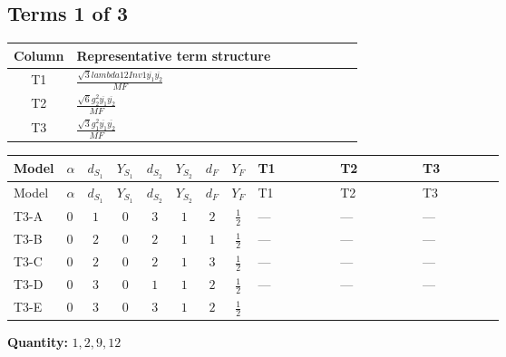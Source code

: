 \documentclass[8pt]{article}
\begin{document}
\begin{landscape}
\subsection*{Terms 1 of 3}
\begin{center}
\begin{tabular}{@{}c >{\raggedright\arraybackslash}p{0.82\linewidth}@{}}
\toprule
Column & Representative term structure \\
\midrule
T1 & \(\displaystyle \frac{\sqrt{3} lambda12Inv1 \overline{y_{1}} \overline{y_{2}}}{MF}\) \\
\midrule
T2 & \(\displaystyle \frac{\sqrt{6} g_{2}^{2} \overline{y_{1}} \overline{y_{2}}}{MF}\) \\
\midrule
T3 & \(\displaystyle \frac{\sqrt{3} g_{1}^{2} \overline{y_{1}} \overline{y_{2}}}{MF}\) \\
\midrule
\bottomrule
\end{tabular}
\end{center}
\smallskip
\tiny
\begin{longtable}{@{}llcccccc >{\raggedright\arraybackslash}p{0.21\linewidth} >{\raggedright\arraybackslash}p{0.21\linewidth} >{\raggedright\arraybackslash}p{0.21\linewidth}@{}}
\toprule
Model & $\alpha$ & $d_{S_1}$ & $Y_{S_1}$ & $d_{S_2}$ & $Y_{S_2}$ & $d_F$ & $Y_F$ & T1 & T2 & T3 \\
\midrule
\endfirsthead
\toprule
Model & $\alpha$ & $d_{S_1}$ & $Y_{S_1}$ & $d_{S_2}$ & $Y_{S_2}$ & $d_F$ & $Y_F$ & T1 & T2 & T3 \\
\midrule
\endhead
T3-A & $0$ & $1$ & $0$ & $3$ & $1$ & $2$ & $\frac{1}{2}$ & --- & --- & --- \\
\midrule
T3-B & $0$ & $2$ & $0$ & $2$ & $1$ & $1$ & $\frac{1}{2}$ & --- & --- & --- \\
\midrule
T3-C & $0$ & $2$ & $0$ & $2$ & $1$ & $3$ & $\frac{1}{2}$ & --- & --- & --- \\
\midrule
T3-D & $0$ & $3$ & $0$ & $1$ & $1$ & $2$ & $\frac{1}{2}$ & --- & --- & --- \\
\midrule
T3-E & $0$ & $3$ & $0$ & $3$ & $1$ & $2$ & $\frac{1}{2}$ & \scriptsize\adjustbox{max width=\linewidth}{$\begin{gathered} - \frac{\sqrt{3} lambda12Inv1 \overline{y_{1}} \overline{y_{2}}}{6 MF}\end{gathered}$} & \scriptsize\adjustbox{max width=\linewidth}{$\begin{gathered} \frac{\sqrt{6} g_{2}^{2} \overline{y_{1}} \overline{y_{2}}}{6 MF}\end{gathered}$} & \scriptsize\adjustbox{max width=\linewidth}{$\begin{gathered} \frac{\sqrt{3} g_{1}^{2} \overline{y_{1}} \overline{y_{2}}}{8 MF}\end{gathered}$} \\
\midrule
\bottomrule
\end{longtable}
\clearpage
\noindent\textbf{Quantity: }$\mathrm{1,2,9,12}$\par\smallskip

\end{landscape}
\end{document}
